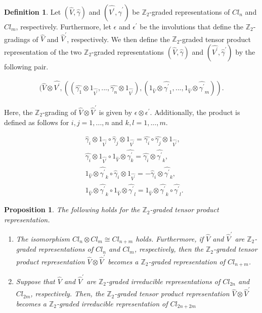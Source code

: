 \documentclass{amsart}
\newtheorem{prop}[thm]{Proposition}
\theoremstyle{definition}
\newtheorem{dfn}[thm]{Definition}
\theoremstyle{remark}
\begin{document}
\begin{dfn}\label{tensor product}
Let $(\hat{V}, \hat{\gamma})$ and $(\hat{V^{\prime}}, \hat{\gamma}^{\prime})$ be $\mathbb{Z}_2$-graded representations of $Cl_n$ and $Cl_m$, respectively. Furthermore, let $\epsilon$ and $\epsilon^{\prime}$ be the involutions that define the $\mathbb{Z}_2$-gradings of $\hat{V}$ and $\hat{V}^{\prime}$, respectively. We then define the $\mathbb{Z}_2$-graded tensor product representation of the two $\mathbb{Z}_{2}$-graded representations $(\hat{V}, \hat{\gamma})$ and $(\hat{V^{\prime}}, \hat{\gamma}^{\prime})$ by the following pair.

\begin{align*}
(\hat{V}\otimes \hat{V^{\prime}}, ((\hat{\gamma_{1}}\otimes 1_{\hat{V^{\prime}}},...,\hat{\gamma_{n}}\otimes 1_{\hat{V^{\prime}}}), (1_{\hat{V}}\otimes \hat{\gamma^{\prime}}_{1},..., 1_{\hat{V}}\otimes \hat{\gamma^{\prime}}_{m})).
\end{align*}

Here, the $\mathbb{Z}_2$-grading of $\hat{V} \otimes \hat{V}^{\prime}$ is given by $\epsilon \otimes \epsilon^{\prime}$. Additionally, the product is defined as follows for $i, j = 1,...,n$ and $k, l=1,..., m$.

\begin{align*}
&\hat{\gamma}_i \otimes 1_{\hat{V^{\prime}}} \circ \hat{\gamma}_j \otimes 1_{\hat{V^{\prime}}}=\hat{\gamma_i}\circ \hat{\gamma_j}\otimes 1_{\hat{V^{\prime}}},\\
&\hat{\gamma_i} \otimes 1_{\hat{V^{\prime}}} \circ 1_{\hat{V}}\otimes \hat{\gamma^{\prime}_k}=\hat{\gamma_i} \otimes \hat{\gamma^{\prime}}_{k},\\
& 1_{\hat{V}} \otimes \hat{\gamma^{\prime}}_k \circ \hat{\gamma}_i \otimes 1_{\hat{V^{\prime}}}=-\hat{\gamma}_i \otimes \hat{\gamma^{\prime}}_k,\\
& 1_{\hat{V}} \otimes \hat{\gamma^{\prime}}_k \circ 1_{\hat{V}} \otimes \hat{\gamma^{\prime}}_l=1_{\hat{V}} \otimes \hat{\gamma^{\prime}}_k \circ \hat{\gamma^{\prime}}_l.
\end{align*}
\end{dfn}

\begin{prop}\label{prop:representation}
The following holds for the $\mathbb{Z}_2$-graded tensor product representation.
\begin{enumerate}
\item The isomorphism $Cl_n \otimes Cl_m \cong Cl_{n+m}$ holds. Furthermore, if $\hat{V}$ and $\hat{V}^{\prime}$ are $\mathbb{Z}_2$-graded representations of $Cl_n$ and $Cl_m$, respectively, then the $\mathbb{Z}_2$-graded tensor product representation $\hat{V} \otimes \hat{V}^{\prime}$ becomes a $\mathbb{Z}_2$-graded representation of $Cl_{n+m}$.
\item Suppose that $\hat{V}$ and $\hat{V}^{\prime}$ are $\mathbb{Z}_2$-graded irreducible representations of $Cl_{2n}$ and $Cl_{2m}$, respectively. Then, the $\mathbb{Z}_2$-graded tensor product representation $\hat{V} \otimes \hat{V}^{\prime}$ becomes a $\mathbb{Z}_2$-graded irreducible representation of $Cl_{2n+2m}$
\end{enumerate}
\end{prop}
\end{document}
